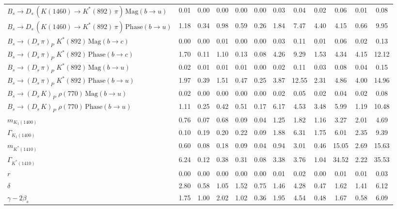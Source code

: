 \begin{tabular}{l  c  c  c  c  c  c  c  c  c  c  | c }
$B_s \to D_s \, ( K(1460) \to K^{*}(892) \, \pi ) \, \text{Mag} (b \to u)$ & 0.01 & 0.00 & 0.00 & 0.00 & 0.00 & 0.03 & 0.04 & 0.02 & 0.06 & 0.01 & 0.08 \\ 
$B_s \to D_s \, ( K(1460) \to K^{*}(892) \, \pi ) \, \text{Phase} (b \to u)$ & 1.18 & 0.34 & 0.98 & 0.59 & 0.26 & 1.84 & 7.47 & 4.40 & 4.15 & 0.66 & 9.95 \\ 
$B_s \to ( D_s \, \pi)_{P} \, \, K^{*}(892) \, \text{Mag} (b \to c)$ & 0.00 & 0.00 & 0.01 & 0.00 & 0.00 & 0.03 & 0.11 & 0.01 & 0.06 & 0.02 & 0.13 \\ 
$B_s \to ( D_s \, \pi)_{P} \, \, K^{*}(892) \, \text{Phase} (b \to c)$ & 1.70 & 0.11 & 1.10 & 0.13 & 0.08 & 4.26 & 9.29 & 1.53 & 4.34 & 4.15 & 12.12 \\ 
$B_s \to ( D_s \, \pi)_{P} \, \, K^{*}(892) \, \text{Mag} (b \to u)$ & 0.02 & 0.01 & 0.01 & 0.01 & 0.00 & 0.02 & 0.11 & 0.03 & 0.08 & 0.04 & 0.15 \\ 
$B_s \to ( D_s \, \pi)_{P} \, \, K^{*}(892) \, \text{Phase} (b \to u)$ & 1.97 & 0.39 & 1.51 & 0.47 & 0.25 & 3.87 & 12.55 & 2.31 & 4.86 & 4.00 & 14.96 \\ 
$B_s \to ( D_s \, K)_{P} \, \, \rho(770) \, \text{Mag} (b \to u)$ & 0.02 & 0.00 & 0.00 & 0.00 & 0.00 & 0.02 & 0.05 & 0.02 & 0.04 & 0.02 & 0.08 \\ 
$B_s \to ( D_s \, K)_{P} \, \, \rho(770) \, \text{Phase} (b \to u)$ & 1.11 & 0.25 & 0.42 & 0.51 & 0.17 & 6.17 & 4.53 & 3.48 & 5.99 & 1.19 & 10.48 \\ 
$m_{K_1(1400)} $ & 0.76 & 0.07 & 0.68 & 0.09 & 0.04 & 1.25 & 1.82 & 1.16 & 3.27 & 2.01 & 4.69 \\ 
$\Gamma_{K_1(1400)}$ & 0.10 & 0.19 & 0.20 & 0.22 & 0.09 & 1.88 & 6.31 & 1.75 & 6.01 & 2.35 & 9.39 \\ 
$m_{K^{*}(1410)}$ & 0.60 & 0.08 & 0.18 & 0.09 & 0.04 & 0.94 & 3.01 & 0.46 & 15.05 & 2.69 & 15.63 \\ 
$\Gamma_{K^{*}(1410)}$ & 6.24 & 0.12 & 0.38 & 0.31 & 0.08 & 3.38 & 3.76 & 1.04 & 34.52 & 2.22 & 35.53 \\ 
$r$ & 0.00 & 0.00 & 0.00 & 0.00 & 0.00 & 0.01 & 0.02 & 0.00 & 0.01 & 0.01 & 0.03 \\ 
$\delta$ & 2.80 & 0.58 & 1.05 & 1.52 & 0.75 & 1.46 & 4.28 & 0.47 & 1.62 & 1.41 & 6.12 \\ 
$\gamma - 2 \beta_{s}$ & 1.75 & 1.00 & 2.02 & 1.02 & 0.36 & 1.95 & 4.54 & 0.48 & 1.67 & 0.58 & 6.09 \\ 
\hline
\hline
\end{tabular}
